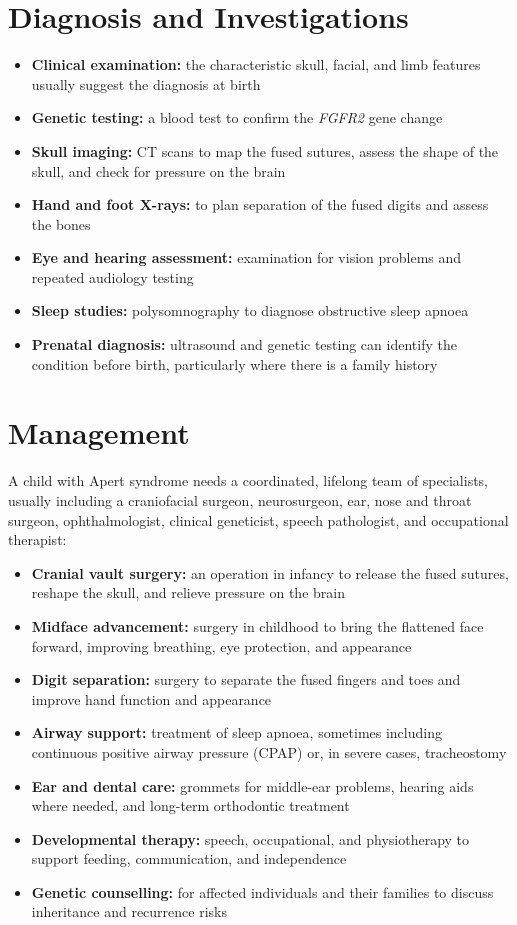 \section*{Diagnosis and Investigations}
\begin{itemize}
    \item \textbf{Clinical examination:} the characteristic skull, facial, and limb features usually suggest the diagnosis at birth
    \item \textbf{Genetic testing:} a blood test to confirm the \textit{FGFR2} gene change
    \item \textbf{Skull imaging:} CT scans to map the fused sutures, assess the shape of the skull, and check for pressure on the brain
    \item \textbf{Hand and foot X-rays:} to plan separation of the fused digits and assess the bones
    \item \textbf{Eye and hearing assessment:} examination for vision problems and repeated audiology testing
    \item \textbf{Sleep studies:} polysomnography to diagnose obstructive sleep apnoea
    \item \textbf{Prenatal diagnosis:} ultrasound and genetic testing can identify the condition before birth, particularly where there is a family history
\end{itemize}

\section*{Management}
A child with Apert syndrome needs a coordinated, lifelong team of specialists, usually including a craniofacial surgeon, neurosurgeon, ear, nose and throat surgeon, ophthalmologist, clinical geneticist, speech pathologist, and occupational therapist:

\begin{itemize}
    \item \textbf{Cranial vault surgery:} an operation in infancy to release the fused sutures, reshape the skull, and relieve pressure on the brain
    \item \textbf{Midface advancement:} surgery in childhood to bring the flattened face forward, improving breathing, eye protection, and appearance
    \item \textbf{Digit separation:} surgery to separate the fused fingers and toes and improve hand function and appearance
    \item \textbf{Airway support:} treatment of sleep apnoea, sometimes including continuous positive airway pressure (CPAP) or, in severe cases, tracheostomy
    \item \textbf{Ear and dental care:} grommets for middle-ear problems, hearing aids where needed, and long-term orthodontic treatment
    \item \textbf{Developmental therapy:} speech, occupational, and physiotherapy to support feeding, communication, and independence
    \item \textbf{Genetic counselling:} for affected individuals and their families to discuss inheritance and recurrence risks
\end{itemize}

